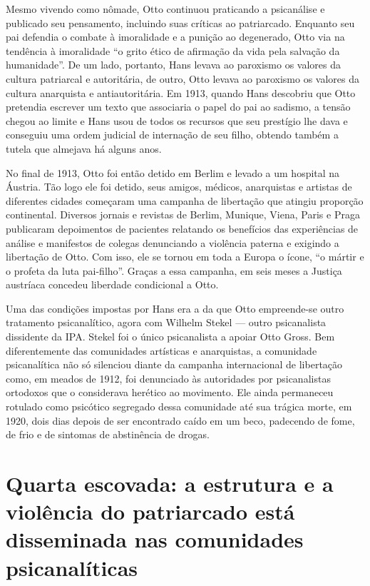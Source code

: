 Mesmo vivendo como nômade, Otto continuou praticando a psicanálise e
publicado seu pensamento, incluindo suas críticas ao patriarcado.
Enquanto seu pai defendia o combate à imoralidade e a punição ao
degenerado, Otto via na tendência à imoralidade ``o grito ético de
afirmação da vida pela salvação da humanidade''. De um lado, portanto,
Hans levava ao paroxismo os valores da cultura patriarcal e autoritária,
de outro, Otto levava ao paroxismo os valores da cultura anarquista e
antiautoritária. Em 1913, quando Hans descobriu que Otto pretendia
escrever um texto que associaria o papel do pai ao sadismo, a tensão
chegou ao limite e Hans usou de todos os recursos que seu prestígio lhe
dava e conseguiu uma ordem judicial de internação de seu filho, obtendo
também a tutela que almejava há alguns anos.

No final de 1913, Otto foi então detido em Berlim e levado a um hospital
na Áustria. Tão logo ele foi detido, seus amigos, médicos, anarquistas e
artistas de diferentes cidades começaram uma campanha de libertação que
atingiu proporção continental. Diversos jornais e revistas de Berlim,
Munique, Viena, Paris e Praga publicaram depoimentos de pacientes
relatando os benefícios das experiências de análise e manifestos de
colegas denunciando a violência paterna e exigindo a libertação de Otto.
Com isso, ele se tornou em toda a Europa o ícone, ``o mártir e o profeta
da luta pai-filho''. Graças a essa campanha, em seis meses a Justiça
austríaca concedeu liberdade condicional a Otto.

Uma das condições impostas por Hans era a da que Otto empreende-se outro
tratamento psicanalítico, agora com Wilhelm Stekel --- outro psicanalista
dissidente da IPA. Stekel foi o único psicanalista a apoiar Otto Gross.
Bem diferentemente das comunidades artísticas e anarquistas, a
comunidade psicanalítica não só silenciou diante da campanha
internacional de libertação como, em meados de 1912, foi denunciado às
autoridades por psicanalistas ortodoxos que o considerava herético ao
movimento. Ele ainda permaneceu rotulado como psicótico segregado dessa
comunidade até sua trágica morte, em 1920, dois dias depois de ser
encontrado caído em um beco, padecendo de fome, de frio e de sintomas de
abstinência de drogas.

\section{Quarta escovada: a estrutura e a violência do patriarcado está
disseminada nas comunidades psicanalíticas}

